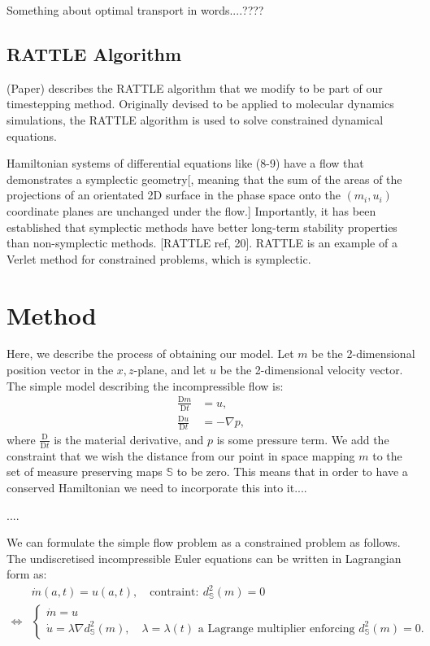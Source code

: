\documentclass[11pt, oneside]{article}   	%
\newcommand{\dsmsq}{d^{2}_{\mathbb{S}}(m)}
\newcommand{\graddsmsq}{\nabla{d^{2}_{\mathbb{S}}(m)}}
\newcommand{\DmDt}{\frac{\mathrm{D}m}{\mathrm{D}t}}
\newcommand{\DuDt}{\frac{\mathrm{D}u}{\mathrm{D}t}}
\begin{document}
Something about optimal transport in words....????



\subsection{RATTLE Algorithm}

(Paper) describes the RATTLE algorithm that we modify to be part of our timestepping method. Originally devised to be applied to molecular dynamics simulations, the RATTLE algorithm is used to solve constrained dynamical equations. 

Hamiltonian systems of differential equations like (8-9) have a flow that demonstrates a symplectic geometry[, meaning that the sum of the areas of the projections of an orientated 2D surface in the phase space onto the \((m_i, u_i)\) coordinate planes are unchanged under the flow.] Importantly, it has been established that symplectic methods have better long-term stability properties than non-symplectic methods. [RATTLE ref, 20]. RATTLE is an example of a Verlet method for constrained problems, which is symplectic.


\section{Method}

Here, we describe the process of obtaining our model. Let \(m\) be the 2-dimensional position vector in the \(x,z\text{-plane}\), and let \(u\) be the 2-dimensional velocity vector. The simple model describing the incompressible flow is:
\begin{align}
\DmDt &= u, \\
\DuDt &= -\nabla p, 
\end{align}
where \(\frac{\mathrm{D}}{\mathrm{D}t}\) is the material derivative, and \(p\) is some pressure term. We add the constraint that we wish the distance from our point in space mapping \(m\) to the set of measure preserving maps \(\mathbb{S}\) to be zero. This means that in order to have a conserved Hamiltonian we need to incorporate this into it....

....

We can formulate the simple flow problem as a constrained problem as follows. The undiscretised incompressible Euler equations can be written in Lagrangian form as:
\begin{align}
& \dot{m}(a, t) = u(a,t), \quad \text{contraint}: \: \dsmsq = 0 \\
\iff
 &\begin{cases}
  \dot{m} = u \\
  \dot{u} = \lambda \graddsmsq, \quad \lambda = \lambda(t) \text{ a Lagrange multiplier enforcing } \dsmsq = 0.
 \end{cases} 
\end{align}
\end{document}

